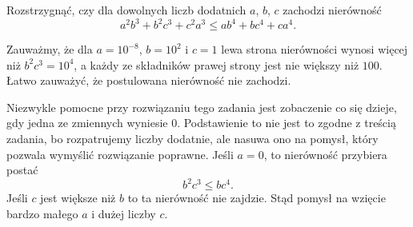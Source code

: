 \begin{problem}{5}
	Rozstrzygnąć, czy dla dowolnych liczb dodatnich $a$, $b$, $c$ zachodzi nierówność
	\[
		a^2b^3 + b^2c^3 + c^2a^3 \leqslant ab^4 + bc^4 + ca^4.
	\]
\end{problem}

\noindent
Zauważmy, że dla $a = 10^{-8}$, $b = 10^{2}$ i  $c = 1$ lewa strona nierówności wynosi więcej niż $b^2c^3 = 10^{4}$, a każdy ze składników prawej strony jest nie większy niż $100$. Łatwo zauważyć, że postulowana nierówność nie zachodzi.

\begin{remark}
	Niezwykle pomocne przy rozwiązaniu tego zadania jest zobaczenie co się dzieje, gdy jedna ze zmiennych wyniesie $0$. Podstawienie to nie jest to zgodne z treścią zadania, bo rozpatrujemy liczby dodatnie, ale nasuwa ono na pomysł, który pozwala wymyślić rozwiązanie poprawne. Jeśli $a = 0$, to nierówność przybiera postać
	\[
		b^2c^3 \leqslant bc^4.
	\]
	Jeśli $c$ jest większe niż $b$ to ta nierówność nie zajdzie. Stąd pomysł na wzięcie bardzo małego $a$ i dużej liczby $c$.
\end{remark}
